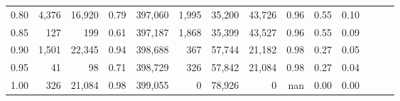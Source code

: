 \begin{tabular}{rrrrrrrrrrrrrr}
0.80 &   4,376 &  16,920 &  0.79 &  397,060 &    1,995 &  35,200 &  43,726 &  0.96 &  0.55 &      0.10 \\
0.85 &     127 &     199 &  0.61 &  397,187 &    1,868 &  35,399 &  43,527 &  0.96 &  0.55 &      0.09 \\
0.90 &   1,501 &  22,345 &  0.94 &  398,688 &      367 &  57,744 &  21,182 &  0.98 &  0.27 &      0.05 \\
0.95 &      41 &      98 &  0.71 &  398,729 &      326 &  57,842 &  21,084 &  0.98 &  0.27 &      0.04 \\
1.00 &     326 &  21,084 &  0.98 &  399,055 &        0 &  78,926 &       0 &   nan &  0.00 &      0.00 \\
\bottomrule
\end{tabular}
